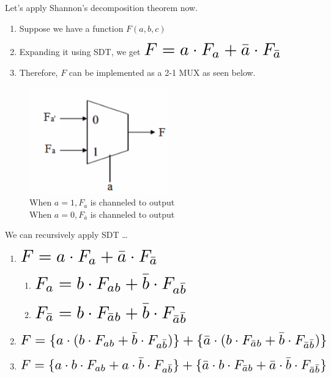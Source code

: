 \documentclass{article}
\newcommand*{\Scale}[2][4]{\scalebox{#1}{\ensuremath{#2}}}%
\begin{document}
Let's apply Shannon's decomposition theorem now.

\begin{enumerate}
    \item Suppose we have a function $F(a,b,c)$
    \item Expanding it using SDT, we get $\Scale[2]{F = a \cdot F_{a} + \bar{a} \cdot F_{\bar{a}}}$
    \item Therefore, $F$ can be implemented as a 2-1 MUX as seen below.
\end{enumerate}

\begin{figure}[htp]
    \centering
    \includegraphics[width=6cm, scale=1]{S2/SDT_1.PNG}
    \caption{When $a=1, F_{a}$ is channeled to output\\
             When $a=0, F_{\bar{a}}$ is channeled to output}
\end{figure}

We can recursively apply SDT \dots
\begin{enumerate}[label*=\arabic*.]
    \item $\Scale[2]{F = a \cdot F_{a} + \bar{a} \cdot F_{\bar{a}}}$
        \begin{enumerate}[label*=\arabic*.]
            \item $\Scale[2]{F_{a} = b \cdot F_{ab} + \bar{b} \cdot F_{a\bar{b}}}$
            \item $\Scale[2]{F_{\bar{a}} = b \cdot F_{\bar{a}b} + \bar{b} \cdot F_{\bar{a}\bar{b}}}$
        \end{enumerate}
    \item $\Scale[2]{F = \{a \cdot (b \cdot F_{ab} + \bar{b} \cdot F_{a\bar{b}})\}
                        + \{\bar{a} \cdot (b \cdot F_{\bar{a}b} + \bar{b} \cdot F_{\bar{a}\bar{b}})\}}$
    \item $\Scale[2]{F = \{a \cdot b \cdot F_{ab} + a \cdot \bar{b} \cdot F_{a\bar{b}}\}
                        + \{\bar{a} \cdot b \cdot F_{\bar{a}b} + \bar{a} \cdot \bar{b} \cdot F_{\bar{a}\bar{b}}\}}$

\end{enumerate}
\end{document}
